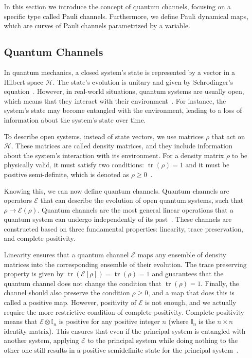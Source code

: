 \documentclass[10pt,letterpaper]{article} %
\DeclareMathOperator{\tr}{tr}
\begin{document}
In this section  we introduce the concept of quantum channels, focusing on a
specific type called Pauli channels.  Furthermore, we define Pauli dynamical
maps, which are curves of Pauli channels parametrized by a variable.
\subsection{Quantum Channels} \label{subsec: Quantum Channels} %


In quantum mechanics, a closed system's state is represented by a vector in a
Hilbert space $\mathcal{H}$.  The state's evolution is unitary and given by
Schrodinger's equation~\cite{Rieffel}.  However, in real-world situations,
quantum systems are usually open, which means that they interact with their
environment~\cite{Breuer}.  For instance, the system's state may become
entangled with the environment, leading to a loss of information about the
system's state over time.

To describe open systems, instead of state vectors, we use matrices $\rho$ that
act on $\mathcal{H}$.  These matrices are called density matrices, and they
include information about the system's interaction with its environment.  For a
density matrix $\rho$ to be physically valid, it must satisfy two conditions:
$\tr(\rho) = 1$ and it must be positive semi-definite, which is denoted as
$\rho \geq 0$~\cite{chuangbook}.


Knowing this, we can now define quantum channels.  Quantum channels are
operators $\mathcal{E}$ that can describe the evolution of open quantum
systems, such that $\rho \rightarrow \mathcal{E}(\rho)$.  Quantum channels are
the most general linear operations that a quantum system can undergo
independently of its past~\cite{zimansbook,cirac}.  These channels are
constructed based on three fundamental properties: linearity, trace
preservation, and complete positivity.

Linearity ensures that a quantum channel $\mathcal{E}$ maps any ensemble of
density matrices into the corresponding ensemble of their evolution.  The trace
preserving property is given by $\tr (\mathcal{E}[\rho]) = \tr (\rho) = 1$ and
guarantees that the quantum channel does not change the condition that
$\tr(\rho) = 1$.  Finally, the channel should also preserve the condition $\rho
\geq 0$, and a map that does this is called a positive map.  However,
positivity of $\mathcal{E}$ is not enough, and we actually require the more
restrictive condition of complete positivity.  Complete positivity means that
$\mathcal{E} \otimes \mathbb{I}_n$ is positive for any positive integer $n$
(where $\mathbb{I}_n$ is the $n\times n$ identity matrix).  This ensures that
even if the principal system is entangled with another system, applying
$\mathcal{E}$ to the principal system while doing nothing to the other one
still results in  a positive semidefinite state for the principal
system~\cite{chuangbook}. 
\end{document}
